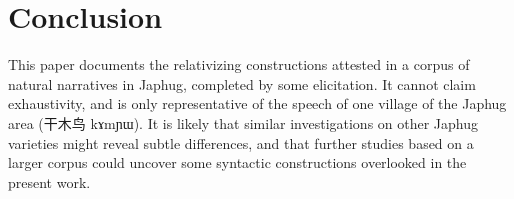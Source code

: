 \documentclass[oldfontcommands,oneside,a4paper,11pt]{article}
\newcommand{\ipa}[1]{{\phon #1}} %
\newcommand{\zh}[1]{{\cn #1}}
\begin{document}
%
%

\section{Conclusion}
This paper documents the relativizing constructions attested in a corpus of natural narratives in Japhug, completed by some elicitation. It cannot claim exhaustivity, and is only representative of the speech of one village of the Japhug area (\zh{干木鸟} \ipa{kɤmɲɯ}). It is likely that similar investigations on other Japhug varieties might reveal subtle differences, and that further studies based on a larger corpus could uncover some syntactic constructions overlooked in the present work.



\end{document}
